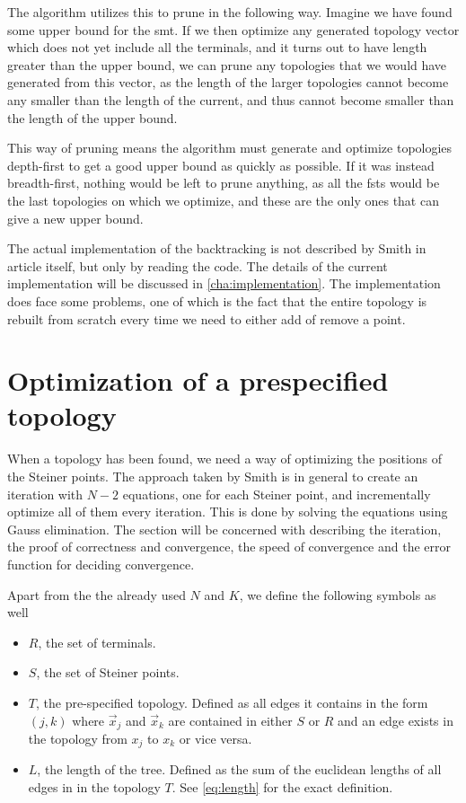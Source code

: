 The algorithm utilizes this to prune in the following way.  Imagine we have
found some upper bound for the \gls{smt}.  If we then optimize any generated
topology vector which does not yet include all the terminals, and it turns out
to have length greater than the upper bound, we can prune any topologies that we
would have generated from this vector, as the length of the larger topologies
cannot become any smaller than the length of the current, and thus cannot become
smaller than the length of the upper bound.

This way of pruning means the algorithm must generate and optimize topologies
depth-first to get a good upper bound as quickly as possible.  If it was instead
breadth-first, nothing would  be left to prune anything, as all the \glspl{fst}
would be the last topologies on which we optimize, and these are the only ones
that can give a new upper bound.

The actual implementation of the backtracking is not described by Smith in
article itself, but only by reading the code.  The details of the current
implementation will be discussed in \cref{cha:implementation}.  The
implementation does face some problems, one of which is the fact that the entire
topology is rebuilt from scratch every time we need to either add of remove a
point.

\section{Optimization of a prespecified topology}
\label{sec:optim-presp-topol}

When a topology has been found, we need a way of optimizing the positions of the
Steiner points.  The approach taken by Smith is in general to create an
iteration with $N-2$ equations, one for each Steiner point, and incrementally
optimize all of them every iteration.  This is done by solving the equations
using Gauss elimination.  The section will be concerned with describing the
iteration, the proof of correctness and convergence, the speed of convergence
and the error function for deciding convergence.

Apart from the the already used $N$ and $K$, we define the following symbols as
well
%
\begin{itemize}
\item $R$, the set of terminals.
\item $S$, the set of Steiner points.
\item $T$, the pre-specified topology.  Defined as all edges it contains in the
form $(j,k)$ where $\vec x_j$ and $\vec x_k$ are contained in either $S$ or $R$
and an edge exists in the topology from $x_j$ to $x_k$ or vice versa.
\item $L$, the length of the tree.  Defined as the sum of the euclidean lengths
of all edges in in the topology $T$.  See \cref{eq:length} for the exact
definition.
\end{itemize}

